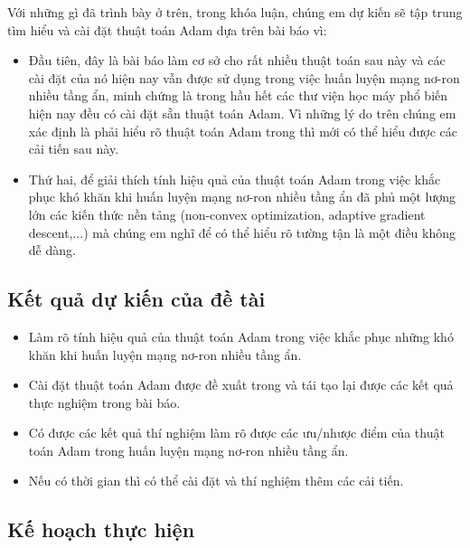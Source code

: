 \documentclass{article}[14pt]
\begin{document}
{\begin{itemize}
    \end{itemize}
    Với những gì đã trình bày ở trên, trong khóa luận, chúng em dự kiến sẽ tập trung tìm hiểu và cài đặt thuật toán Adam dựa trên bài báo \cite{Kingma2015AdamAM} vì:
    \begin{itemize}
        \item Đầu tiên, đây là bài báo làm cơ sở cho rất nhiều thuật toán sau này và các cài đặt của nó hiện nay vẫn được sử dụng trong việc huấn luyện mạng nơ-ron nhiều tầng ẩn, minh chứng là trong hầu hết các thư viện học máy phổ biến hiện nay đều có cài đặt sẵn thuật toán Adam. Vì những lý do trên chúng em xác định là phải hiểu rõ thuật toán Adam trong \cite{Kingma2015AdamAM} thì mới có thể hiểu được các cải tiến sau này.
        \item Thứ hai, để giải thích tính hiệu quả của thuật toán Adam trong việc khắc phục khó khăn khi huấn luyện mạng nơ-ron nhiều tầng ẩn đã phủ một lượng lớn các kiến thức nền tảng (non-convex optimization, adaptive gradient descent,...) mà chúng em nghĩ để có thể hiểu rõ tường tận là một điều không dễ dàng.
    \end{itemize}
    
    \subsection{Kết quả dự kiến của đề tài}
        
    \begin{itemize}
        \item Làm rõ tính hiệu quả của thuật toán Adam trong việc khắc phục những khó khăn khi huấn luyện mạng nơ-ron nhiều tầng ẩn.
        \item Cài đặt thuật toán Adam được đề xuất trong  \cite{Kingma2015AdamAM} và tái tạo lại được các kết quả thực nghiệm trong bài báo.
        \item Có được các kết quả thí nghiệm làm rõ được các ưu/nhược điểm của thuật toán Adam trong huấn luyện mạng nơ-ron nhiều tầng ẩn.
        \item Nếu có thời gian thì có thể cài đặt và thí nghiệm thêm các cải tiến.
    \end{itemize}
    
    \subsection{Kế hoạch thực hiện}
    
}
\end{document}

